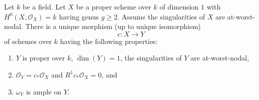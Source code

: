 \begin{lemma}
\label{lemma-characterize-contraction-to-stable}
Let $k$ be a field. Let $X$ be a proper scheme over $k$ of dimension
$1$ with $H^0(X, \mathcal{O}_X) = k$ having genus $g \geq 2$.
Assume the singularities of $X$ are at-worst-nodal.
There is a unique morphism (up to unique isomorphism)
$$
c : X \longrightarrow Y
$$
of schemes over $k$ having the following properties:
\begin{enumerate}
\item $Y$ is proper over $k$, $\dim(Y) = 1$, the singularities of $Y$
are at-worst-nodal,
\item $\mathcal{O}_Y = c_*\mathcal{O}_X$ and $R^1c_*\mathcal{O}_X = 0$, and
\item $\omega_Y$ is ample on $Y$.
\end{enumerate}
\end{lemma}

